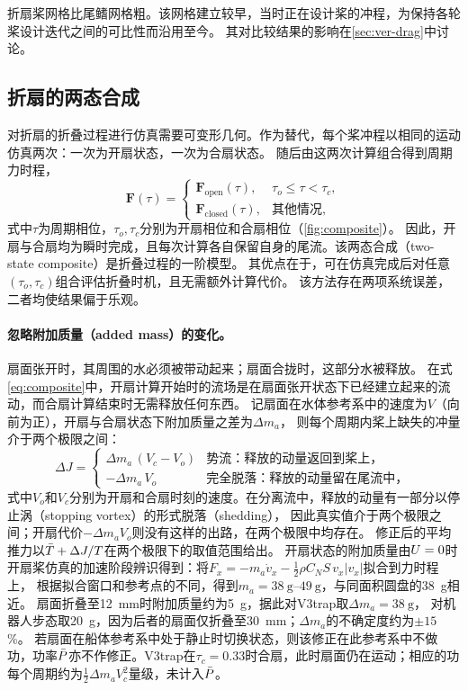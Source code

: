 折扇桨网格比尾鳍网格粗。该网格建立较早，当时正在设计桨的冲程，为保持各轮桨设计迭代之间的可比性而沿用至今。
其对比较结果的影响在\cref{sec:ver-drag}中讨论。

\subsection{折扇的两态合成}
\label{sec:cfd-composite}

对折扇的折叠过程进行仿真需要可变形几何。作为替代，每个桨冲程以相同的运动仿真两次：一次为开扇状态，一次为合扇状态。
随后由这两次计算组合得到周期力时程，
\begin{equation}
  \bm F(\tau) = \begin{cases}
    \bm F_\text{open}(\tau), & \tau_o \le \tau < \tau_c,\\
    \bm F_\text{closed}(\tau), & \text{其他情况},
  \end{cases}
  \label{eq:composite}
\end{equation}
式中$\tau$为周期相位，$\tau_o,\tau_c$分别为开扇相位和合扇相位（\cref{fig:composite}）。
因此，开扇与合扇均为瞬时完成，且每次计算各自保留自身的尾流。该两态合成（two-state composite）是折叠过程的一阶模型。
其优点在于，可在仿真完成后对任意$(\tau_o,\tau_c)$组合评估折叠时机，且无需额外计算代价。
该方法存在两项系统误差，二者均使结果偏于乐观。

\paragraph{忽略附加质量（added mass）的变化。}扇面张开时，其周围的水必须被带动起来；扇面合拢时，这部分水被释放。
在式\eqref{eq:composite}中，开扇计算开始时的流场是在扇面张开状态下已经建立起来的流动，而合扇计算结束时无需释放任何东西。
记扇面在水体参考系中的速度为$V$（向前为正），开扇与合扇状态下附加质量之差为$\Delta m_a$，
则每个周期内桨上缺失的冲量介于两个极限之间：
\begin{equation}
  \Delta J = \begin{cases}
    \Delta m_a\,(V_c - V_o) & \text{势流：释放的动量返回到桨上，}\\
    -\Delta m_a\,V_o & \text{完全脱落：释放的动量留在尾流中，}
  \end{cases}
  \label{eq:addedmass}
\end{equation}
式中$V_o$和$V_c$分别为开扇和合扇时刻的速度。在分离流中，释放的动量有一部分以停止涡（stopping vortex）的形式脱落（shedding），
因此真实值介于两个极限之间；开扇代价$-\Delta m_a V_o$则没有这样的出路，在两个极限中均存在。
修正后的平均推力以$\bar{T}+\Delta J/T$在两个极限下的取值范围给出。
开扇状态的附加质量由$U=0$时开扇桨仿真的加速阶段辨识得到：将$F_x=-m_a\dot v_x-\tfrac12\rho C_N S\,v_x|v_x|$拟合到力时程上，
根据拟合窗口和参考点的不同，得到$m_a=\SIrange{38}{49}{\gram}$，与同面积圆盘的\SI{38}{\gram}相近。
扇面折叠至\SI{12}{\milli\metre}时附加质量约为\SI{5}{\gram}，据此对V3trap取$\Delta m_a=\SI{38}{\gram}$，
对机器人步态取\SI{20}{\gram}，因为后者的扇面仅折叠至\SI{30}{\milli\metre}；$\Delta m_a$的不确定度约为$\pm15$\,\%。
若扇面在船体参考系中处于静止时切换状态，则该修正在此参考系中不做功，功率$\bar{P}$亦不作修正。V3trap在$\tau_c=0.33$时合扇，此时扇面仍在运动；相应的功每个周期约为$\tfrac12\Delta m_a V_c^2$量级，未计入$\bar{P}$。

